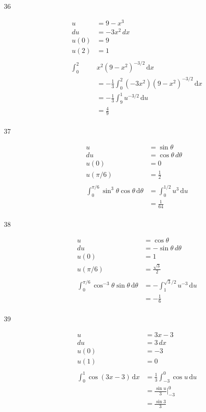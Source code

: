 \documentclass{exam}
\begin{document}
\begin{description}
\item[36]
\begin{align*}
  u &= 9 - x^3 \\
  du &= -3x^2 \, dx \\
  u(0) &= 9 \\
  u(2) &= 1 \\
\\
  \int_0^2 & x^2 (9 - x^2)^{-3/2} \, \mathrm{d}x \\
  &= -\frac{1}{3} \int_0^2 (-3 x^2) (9 - x^2)^{-3/2} \, \mathrm{d}x \\
  &= -\frac{1}{3} \int_9^1 u^{-3/2} \, \mathrm{d}u \\
  &= \frac{4}{9} \\
\end{align*}

\item[37]
\begin{align*}
  u &= \sin \theta \\
  du &= \cos \theta \, d\theta \\
  u(0) &= 0 \\
  u(\pi/6) &= \frac{1}{2} \\
\\
  \int_0^{\pi/6} \sin^3 \theta \cos \theta\, \mathrm{d}\theta &= \int_0^{1/2} u^3 \, \mathrm{d}u \\
  &= \frac{1}{64} \\
\end{align*}

\item[38]
\begin{align*}
  u &= \cos \theta \\
  du &= - \sin \theta \, d\theta \\
  u(0) &= 1 \\
  u(\pi/6) &= \frac{\sqrt{3}}{2} \\
\\
  \int_0^{\pi/6} \cos^{-3} \theta \sin \theta\, \mathrm{d}\theta &= - \int_1^{\sqrt{3}/2} u^{-3} \, \mathrm{d}u \\
  &= - \frac{1}{6} \\
\end{align*}

\item[39]
\begin{align*}
  u &= 3x - 3 \\
  du &= 3 \, dx \\
  u(0) &= -3 \\
  u(1) &= 0 \\
\\
  \int_0^1 \cos(3x - 3) \, \mathrm{d}x &= \frac{1}{3} \int_{-3}^{0} \cos u \, \mathrm{d}u \\
  &= \frac{\sin u}{3} \bigg|_{-3}^{0} \\
  &= \frac{\sin 3}{3} \\
\end{align*}


\end{description}
\end{document}
